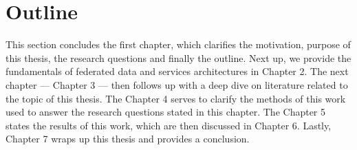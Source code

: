 \section{Outline}\label{sec:outline}

This section concludes the first chapter, which clarifies the motivation, purpose of this thesis, the research questions and finally the outline.
Next up, we provide the fundamentals of federated data and services architectures in Chapter 2.
The next chapter --- Chapter 3 --- then follows up with a deep dive on literature related to the topic of this thesis.
The Chapter 4 serves to clarify the methods of this work used to answer the research questions stated in this chapter.
The Chapter 5 states the results of this work, which are then discussed in Chapter 6.
Lastly, Chapter 7 wraps up this thesis and provides a conclusion.
